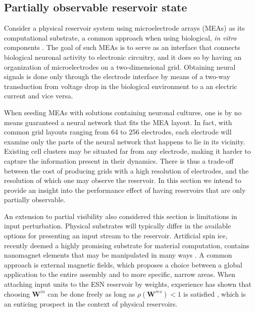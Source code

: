 \subsection{Partially observable reservoir state}

Consider a physical reservoir system using microelectrode arrays (MEAs) as its
computational substrate, a common approach when using biological, \textit{in
vitro} components \cite{aaser_towards_2017}. The goal of such MEAs is to serve
as an interface that connects biological neuronal activity to electronic
circuitry, and it does so by having an organization of microelectrodes on a
two-dimensional grid. Obtaining neural signals is done only through the
electrode interface by means of a two-way transduction from voltage drop in the
biological environment to a an electric current and vice versa.

When seeding MEAs with solutions containing neuronal cultures, one is by no
means guaranteed a neural network that fits the MEA layout. In fact, with common
grid layouts ranging from 64 to 256 electrodes, each electrode will examine only
the parts of the neural network that happens to lie in its vicinity. Existing
cell clusters may be situated far from any electrode, making it harder to
capture the information present in their dynamics. There is thus a trade-off
between the cost of producing grids with a high resolution of electrodes, and
the resolution of which one may observe the reservoir. In this section we intend
to provide an insight into the performance effect of having reservoirs that are
only partially observable.

An extension to partial visibility also considered this section is limitations
in input perturbation. Physical substrates will typically differ in the
available options for presenting an input stream to the reservoir. Artificial
spin ice, recently deemed a highly promising substrate for material computation,
contains nanomagnet elements that may be manipulated in many ways
\cite{jensen_computation_2018}. A common approach is external magnetic fields,
which proposes a choice between a global application to the entire assembly and
to more specific, narrow areas. When attaching input units to the ESN reservoir
by weights, experience has shown that choosing $\mathbf{W}^{in}$ can be done
freely as long as $\rho(\mathbf{W}^{res}) < 1$ is satisfied
\cite{jaeger_echo_2001}, which is an enticing prospect in the context of
physical reservoirs.

